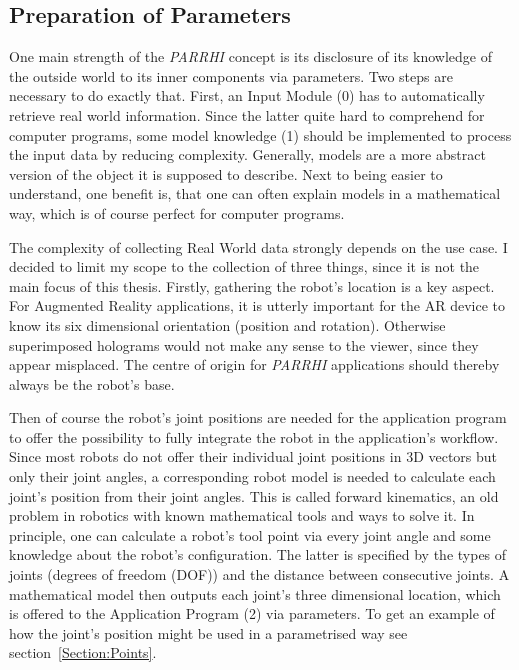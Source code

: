 \subsection{Preparation of Parameters}
One main strength of the \textit{PARRHI} concept is its disclosure of its knowledge of the outside world to its inner components via parameters. Two steps are necessary to do exactly that. First, an Input Module (0) has to automatically retrieve real world information. Since the latter quite hard to comprehend for computer programs, some model knowledge (1) should be implemented to process the input data by reducing complexity. Generally, models are a more abstract version of the object it is supposed to describe. Next to being easier to understand, one benefit is, that one can often explain models in a mathematical way, which is of course perfect for computer programs. 

The complexity of collecting Real World data strongly depends on the use case. I decided to limit my scope to the collection of three things, since it is not the main focus of this thesis. Firstly, gathering the robot's location is a key aspect. For Augmented Reality applications, it is utterly important for the AR device to know its six dimensional orientation (position and rotation). Otherwise superimposed holograms would not make any sense to the viewer, since they appear misplaced. The centre of origin for \textit{PARRHI} applications should thereby always be the robot's base. 

Then of course the robot's joint positions are needed for the application program to offer the possibility to fully integrate the robot in the application's workflow. Since most robots do not offer their individual joint positions in 3D vectors but only their joint angles, a corresponding robot model is needed to calculate each joint's position from their joint angles. This is called forward kinematics, an old problem in robotics with known mathematical tools and ways to solve it. In principle, one can calculate a robot's tool point via every joint angle and some knowledge about the robot's configuration. The latter is specified by the types of joints (degrees of freedom (DOF)) and the distance between consecutive joints. A mathematical model then outputs each joint's three dimensional location, which is offered to the Application Program (2) via parameters. To get an example of how the joint's position might be used in a parametrised way see section~\ref{Section:Points}.

\clearpage
